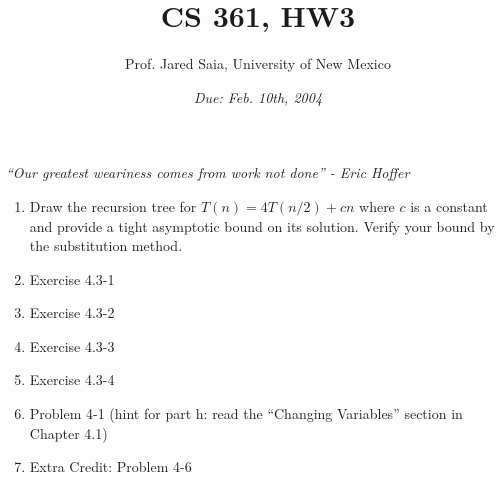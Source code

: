 \documentclass[11pt]{article}
\begin{document}
\title{CS 361, HW3}

\author {Prof. Jared Saia, University of New Mexico}

\date{\emph{Due: Feb. 10th, 2004}}
\maketitle

\emph{``Our greatest weariness comes from work not done'' - Eric Hoffer} \\

\begin{enumerate}

\item Draw the recursion tree for $T(n) = 4T(n/2)+cn$ where $c$ is a
constant and provide a tight asymptotic bound on its solution.  Verify
your bound by the substitution method.

\item Exercise 4.3-1

\item Exercise 4.3-2

\item Exercise 4.3-3

\item Exercise 4.3-4

\item Problem 4-1 (hint for part h: read the ``Changing Variables''
section in Chapter 4.1)

\item Extra Credit: Problem 4-6

\end{enumerate}
\end{document}
